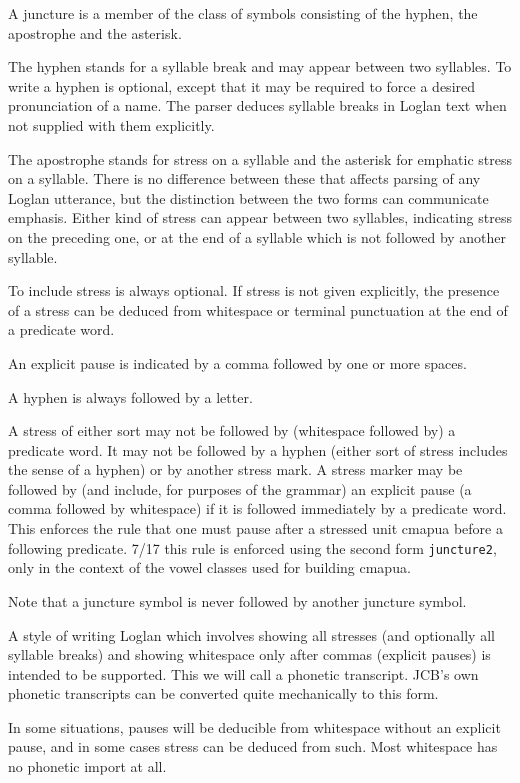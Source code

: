 \documentclass[12pt]{article}
\begin{document}
A juncture is a member of the class of symbols consisting of the hyphen, the apostrophe and the asterisk.

The hyphen stands for a syllable break and may appear between two syllables.  To write a hyphen is optional, except that it may be required to force a desired pronunciation of a name.  The parser deduces syllable breaks in Loglan text when not supplied with them explicitly.

The apostrophe stands for stress on a syllable and the asterisk for emphatic stress on a syllable.  There is no difference between these that affects parsing of any Loglan utterance, but the distinction between the two forms can communicate emphasis.  Either kind of stress can appear between two syllables, indicating stress on the preceding one, or at the end of a syllable which is not followed by another syllable.

To include stress is always optional.  If stress is not given explicitly, the presence of a stress can be deduced
from whitespace or terminal punctuation at the end of a predicate word.

An explicit pause is indicated by a comma followed by one or more spaces.

A hyphen is always followed by a letter.

A stress of either sort may not be followed by (whitespace followed by) a predicate word.  It may not
be followed by a hyphen (either sort of stress includes the sense of a hyphen) or by another stress mark.
A stress marker may be followed by (and include, for purposes of the grammar) an explicit pause (a comma followed by whitespace)
if it is followed immediately by a predicate word.  This enforces the rule that one must pause after a stressed unit cmapua before a following predicate.   7/17 this rule
is enforced using the second form {\tt juncture2}, only in the context of the vowel classes used for building cmapua.

Note that a juncture symbol is never followed by another juncture symbol.

A style of writing Loglan which involves showing all stresses (and optionally all syllable breaks) and showing whitespace only after commas (explicit pauses) is intended to be supported.  This we will call a phonetic transcript.  JCB's own phonetic transcripts can be converted quite mechanically to this form.

In some situations, pauses will be deducible from whitespace without an explicit pause, and in some cases stress can be deduced from such.  Most whitespace has no phonetic import at all.
\end{document}

